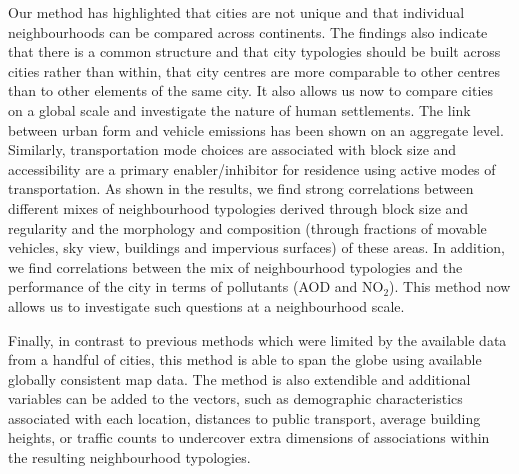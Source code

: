 \documentclass[9pt,twocolumn,twoside,lineno]{pnas-new}
\begin{document}
Our method has highlighted that cities are not unique and that individual neighbourhoods can be compared across continents. The findings also indicate that there is a common structure and that city typologies should be built across cities rather than within, that city centres are more comparable to other centres than to other elements of the same city. It also allows us now to compare cities on a global scale and investigate the nature of human settlements. The link between urban form and vehicle emissions has been shown on an aggregate level\cite{Frank2000}. Similarly, transportation mode choices are associated with block size and accessibility are a primary enabler/inhibitor for residence using active modes of transportation\cite{Ewing2001,Ewing2009a}. As shown in the results, we find strong correlations between different mixes of neighbourhood typologies derived through block size and regularity and the morphology and composition (through fractions of movable vehicles, sky view, buildings and impervious surfaces) of these areas. In addition, we find correlations between the mix of neighbourhood typologies and the performance of the city in terms of pollutants (AOD and NO$_{2}$). This method now allows us to investigate such questions at a neighbourhood scale. 

Finally, in contrast to previous methods which were limited by the available data from a handful of cities, this method is able to span the globe using available globally consistent map data. The method is also extendible and additional variables can be added to the vectors, such as demographic characteristics associated with each location\cite{Kropp1998}, distances to public transport, average building heights, or traffic counts to undercover extra dimensions of associations within the resulting neighbourhood typologies.
\end{document}
